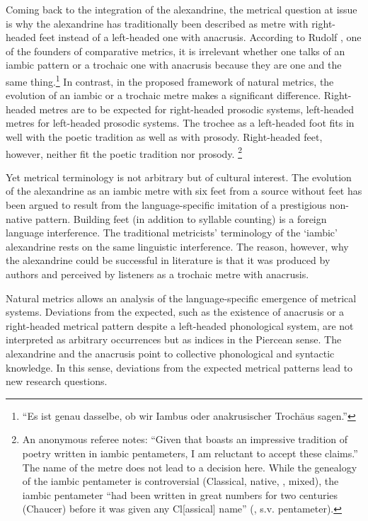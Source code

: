 \documentclass[output=paper
  ,nobabel
  ,uniformtopskip %
]{langscibook}
\begin{document}
Coming back to the integration of the  alexandrine, the metrical question at issue is why the  alexandrine has traditionally been described as metre with right-headed feet instead of a left-headed one with anacrusis. According to Rudolf \citet[154]{Westphal1892}, one of the founders of comparative metrics, it is irrelevant whether one talks of an iambic pattern or a trochaic one with anacrusis because they are one and the same thing.\footnote{
``Es ist genau dasselbe, ob wir Iambus oder anakrusischer Trochäus sagen.''} In contrast, in the proposed framework of natural metrics, the evolution of an iambic or a trochaic metre makes a significant difference. Right-headed metres are to be expected for right-headed prosodic systems, left-headed metres for left-headed prosodic systems. The trochee as a left-headed foot fits in well with the  poetic tradition as well as with  prosody. Right-headed feet, however, neither fit the  poetic tradition nor  prosody.%
%
\footnote{An anonymous referee notes: ``Given that  boasts an impressive tradition of poetry written in iambic pentameters, I am reluctant to accept these claims.'' The name of the  metre does not lead to a decision here. While the genealogy of the  iambic pentameter is controversial (Classical, native, , mixed), the  iambic pentameter ``had been written in great numbers for two centuries (Chaucer) before it was given any Cl[assical] name'' (\citealt{Encyclopedia1993}, s.v. pentameter).} 

Yet metrical terminology is not arbitrary but of cultural interest. The evolution of the  alexandrine as an iambic metre with six feet from a  source without feet has been argued to result from the language-specific imitation of a prestigious non-native pattern. Building feet (in addition to syllable counting) is a foreign language interference. The traditional metricists' terminology of the `iambic' alexandrine rests on the same linguistic interference. The reason, however, why the alexandrine could be successful in  literature is that it was produced by  authors and perceived by  listeners as a trochaic metre with anacrusis.

Natural metrics allows an analysis of the language-specific emergence of metrical systems. Deviations from the expected, such as the existence of anacrusis or a right-headed metrical pattern despite a left-headed phonological system, are not interpreted as arbitrary occurrences but as indices in the Piercean sense. The  alexandrine and the  anacrusis point to collective phonological and syntactic knowledge. In this sense, deviations from the expected metrical patterns lead to new research questions.
\end{document}
